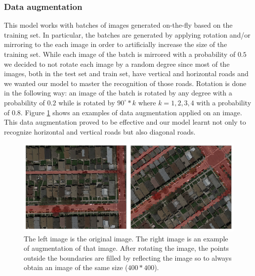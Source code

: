 \documentclass[10pt,conference,compsocconf]{IEEEtran}
\begin{document}
\subsubsection*{Data augmentation}
 This model works with batches of images generated on-the-fly based on the training set. In particular, the batches are generated by applying rotation and/or mirroring to the each image in order to artificially increase the size of the training set. While each image of the batch is mirrored with a probability of $0.5$ we decided to not rotate each image by a random degree since most of the images, both in the test set and train set, have vertical and horizontal roads and we wanted our model to master the recognition of those roads. Rotation is done in the following way: an image of the batch is rotated by any degree with a probability of $0.2$ while is rotated by $90^\circ*k$ where $k=1,2,3,4$ with a probability of $0.8$. Figure \ref{fig:data-augmentation} shows an examples of data augmentation applied on an image. This data augmentation proved to be effective and our model learnt not only to recognize horizontal and vertical roads but also diagonal roads.
\begin{figure}[tbp]
	\centering
	\includegraphics[width=0.8\columnwidth]{img/data_augmentation2.png}
	\caption{The left image is the original image. The right image is an example of augmentation of that image. After rotating the image, the points outside the boundaries are filled by reflecting the image so to always obtain an image of the same size ($400*400$).}
	\vspace{-3mm}
	\label{fig:data-augmentation}
\end{figure}
\end{document}
